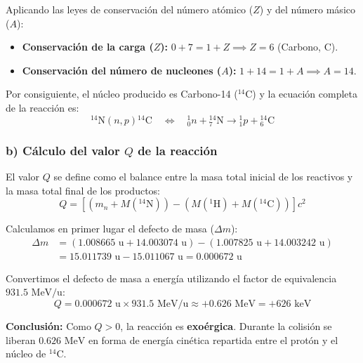 \begin{problema}
Aplicando las leyes de conservación del número atómico ($Z$) y del número másico ($A$):
\begin{itemize}
    \item \textbf{Conservación de la carga ($Z$):} $0 + 7 = 1 + Z \implies Z = 6$ (Carbono, $\text{C}$).
    \item \textbf{Conservación del número de nucleones ($A$):} $1 + 14 = 1 + A \implies A = 14$.
\end{itemize}

Por consiguiente, el núcleo producido es Carbono-14 (${}^{14}\text{C}$) y la ecuación completa de la reacción es:
\begin{equation}
{}^{14}\text{N}(n,p){}^{14}\text{C} \quad \Longleftrightarrow \quad {}_0^1 n + {}_7^{14}\text{N} \longrightarrow {}_1^1 p + {}_6^{14}\text{C}
\end{equation}

\subsubsection*{b) Cálculo del valor $Q$ de la reacción}

El valor $Q$ se define como el balance entre la masa total inicial de los reactivos y la masa total final de los productos:
\begin{equation}
Q = \left[ (m_n + M({}^{14}\text{N})) - (M({}^1\text{H}) + M({}^{14}\text{C})) \right] c^2
\end{equation}

Calculamos en primer lugar el defecto de masa ($\Delta m$):
\begin{align}
\Delta m &= (1.008665\text{ u} + 14.003074\text{ u}) - (1.007825\text{ u} + 14.003242\text{ u}) \nonumber \\
&= 15.011739\text{ u} - 15.011067\text{ u} = 0.000672\text{ u}
\end{align}

Convertimos el defecto de masa a energía utilizando el factor de equivalencia $931.5\text{ MeV/u}$:
\begin{equation}
Q = 0.000672\text{ u} \times 931.5\text{ MeV/u} \approx +0.626\text{ MeV} = +626\text{ keV}
\end{equation}

\textbf{Conclusión:} Como $Q > 0$, la reacción es \textbf{exoérgica}. Durante la colisión se liberan $0.626\text{ MeV}$ en forma de energía cinética repartida entre el protón y el núcleo de ${}^{14}\text{C}$.

\end{problema}


